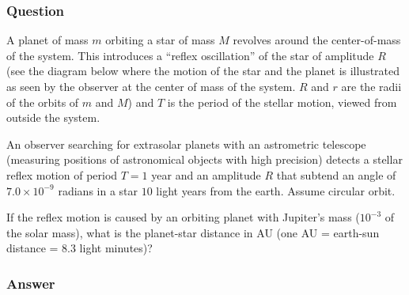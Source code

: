 \subsubsection{Question}
A planet of mass $m$ orbiting a star of mass $M$ revolves around the center-of-mass of the system. This introduces a “reflex oscillation” of the star of amplitude $R$ (see the diagram below where the motion of the star and the planet is illustrated as seen by the observer at the center of mass of the system. $R$ and $r$ are the radii of the orbits of $m$ and $M$) and $T$ is the period of the stellar motion, viewed from outside the system.

An observer searching for extrasolar planets with an astrometric telescope (measuring positions of astronomical objects with high precision) detects a stellar reflex motion of period $T = 1$ year and an amplitude $R$ that subtend an angle of $7.0\times10^{-9}$ radians in a star $10$ light years from the earth. Assume circular orbit.

If the reflex motion is caused by an orbiting planet with Jupiter’s mass ($10^{-3}$ of the solar mass), what is the planet-star distance in AU (one AU = earth-sun distance = 8.3 light minutes)?
\subsubsection{Answer}
